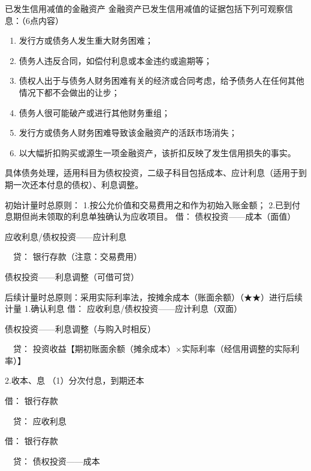 \documentclass[UTF8,12pt]{ctexart}
\newenvironment{Dr}{\noindent 借：}{\par}
\newenvironment{Cr}{\noindent \ \ 贷：}{\par}
\numberwithin{equation}{section} %
\numberwithin{figure}{section}
\numberwithin{table}{section}
\begin{document}
	已发生信用减值的金融资产
	金融资产已发生信用减值的证据包括下列可观察信息：（6点内容）
	\begin{enumerate}
		\item 发行方或债务人发生重大财务困难；
		
		\item 债务人违反合同，如偿付利息或本金违约或逾期等；
		
		\item 债权人出于与债务人财务困难有关的经济或合同考虑，给予债务人在任何其他情况下都不会做出的让步；
		
		\item 债务人很可能破产或进行其他财务重组；
		
		\item 发行方或债务人财务困难导致该金融资产的活跃市场消失；
		
		\item 以大幅折扣购买或源生一项金融资产，该折扣反映了发生信用损失的事实。
	\end{enumerate}
	
	具体债务处理，适用科目为债权投资，二级子科目包括成本、应计利息（适用于到期一次还本付息的债权）、利息调整。
	
	初始计量时总原则：
	1.按公允价值和交易费用之和作为初始入账金额；
	2.已到付息期但尚未领取的利息单独确认为应收项目。
	\begin{Dr}
		债权投资——成本（面值）
		
		应收利息/债权投资——应计利息
	\end{Dr}
	\begin{Cr}
		银行存款（注意：交易费用）
		
		债权投资——利息调整（可借可贷）
	\end{Cr}
	
	后续计量时总原则：采用实际利率法，按摊余成本（账面余额）（★★）进行后续计量
	1.确认利息
	\begin{Dr}
		应收利息/债权投资——应计利息（双面）
		
		债权投资——利息调整（与购入时相反）
	\end{Dr}
	\begin{Cr}
		投资收益【期初账面余额（摊余成本）×实际利率（经信用调整的实际利率）】
	\end{Cr}

	2.收本、息
	（1）分次付息，到期还本
	
	\begin{Dr}
		银行存款
	\end{Dr}
	\begin{Cr}
		应收利息
	\end{Cr}
	\begin{Dr}
		银行存款
	\end{Dr}
	\begin{Cr}
		债权投资——成本
	\end{Cr}
\end{document}
